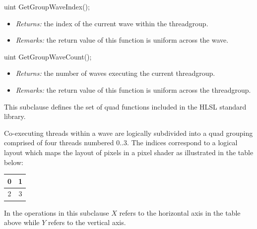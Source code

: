 \begin{HLSL}
uint GetGroupWaveIndex();
\end{HLSL}

\begin{itemize}
  \item \textit{Returns:} the index of the current \gls{wave} within the
  \gls{threadgroup}.
  \item \textit{Remarks:} the return value of this function is uniform across
  the \gls{wave}.
\end{itemize}

\begin{HLSL}
uint GetGroupWaveCount();
\end{HLSL}

\begin{itemize}
  \item \textit{Returns:} the number of \gls{wave}s executing the current
  \gls{threadgroup}.
  \item \textit{Remarks:} the return value of this function is uniform across
  the \gls{threadgroup}.
\end{itemize}


\p This subclause defines the set of \gls{quad} functions included in the
HLSL standard library.

\p Co-executing threads within a \gls{wave} are logically subdivided into a quad
grouping comprised of four threads numbered $0..3$. The indices correspond to a
logical layout which maps the layout of pixels in a pixel shader as illustrated
in the table below:

\begin{center}
  \begin{tabular}{| c | c |}
    \hline 0 & 1 \\
    \hline 2 & 3 \\
    \hline
  \end{tabular}
\end{center}

\p In the operations in this subclause $X$ refers to the horizontal axis in the
table above while $Y$ refers to the vertical axis.


